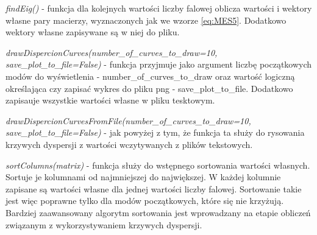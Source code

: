 \vspace {3mm}
\textit{findEig()} - funkcja dla kolejnych wartości liczby falowej oblicza wartości i wektory własne pary macierzy, wyznaczonych jak we wzorze \ref{eq:MES5}. Dodatkowo wektory własne zapisywane są w niej do pliku.

\vspace {3mm}
\textit{drawDispercionCurves(number\_of\_curves\_to\_draw=10, save\_plot\_to\_file=False)} - funkcja przyjmuje jako argument liczbę początkowych modów do wyświetlenia - number\_of\_curves\_to\_draw oraz wartość logiczną określająca czy zapisać wykres do pliku png - save\_plot\_to\_file. Dodatkowo zapisauje wszystkie wartości własne w pliku tesktowym.

\vspace {3mm}
\textit{drawDispercionCurvesFromFile(number\_of\_curves\_to\_draw=10, save\_plot\_to\_file=False)} - jak powyżej z tym, że funkcja ta służy do rysowania krzywych dyspersji z wartości wczytywanych z plików tekstowych.

\vspace {3mm}
\textit{sortColumns(matrix)} - funkcja służy do wstępnego sortowania wartości własnych. Sortuje je kolumnami od najmniejszej do największej. W każdej kolumnie zapisane są wartości własne dla jednej wartości liczby falowej. Sortowanie takie jest więc poprawne tylko dla modów początkowych, które się nie krzyżują. Bardziej zaawansowany algorytm sortowania jest wprowadzany na etapie obliczeń związanym z wykorzystywaniem krzywych dyspersji.
%
%
%
%
%

